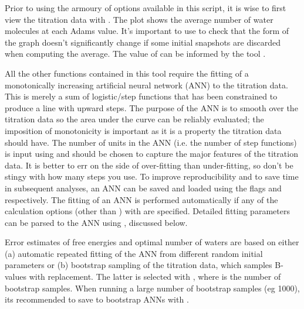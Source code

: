 \documentclass[letterpaper,10pt,english]{sphinxmanual}
\begin{document}
Prior to using the armoury of options available in this script, it is wise to first view the titration data with . The plot shows the average number of water molecules at each Adams value. It’s important to use  to check that the form of the graph doesn’t significantly change if some initial snapshots are discarded when computing the average. The value of  can be informed by the tool .

All the other functions contained in this tool require the fitting of a monotonically increasing artificial neural network (ANN) to the titration data. This is merely a sum of logistic/step functions that has been constrained to produce a line with upward steps. The purpose of the ANN is to smooth over the titration data so the area under the curve can be reliably evaluated; the imposition of monotonicity is important as it is a property the titration data should have. The number of units in the ANN (i.e. the number of step functions) is input using  and should be chosen to capture the major features of the titration data. It is better to err on the side of over-fitting than under-fitting, so don’t be stingy with how many steps you use. To improve reproducibility and to save time in subsequent analyses, an ANN can be saved and loaded using the flags  and  respectively. The fitting of an ANN is performed automatically if any of the calculation options (other than ) with  are specified. Detailed fitting parameters can be parsed to the ANN using , discussed below.

Error estimates of free energies and optimal number of waters are based on either (a) automatic repeated fitting of the ANN from different random initial parameters or (b) bootstrap sampling of the titration data, which samples B-values with replacement. The latter is selected with , where  is the number of bootstrap samples. When running a large number of bootstrap samples (eg 1000), its recommended to save to bootstrap ANNs with .
\end{document}
